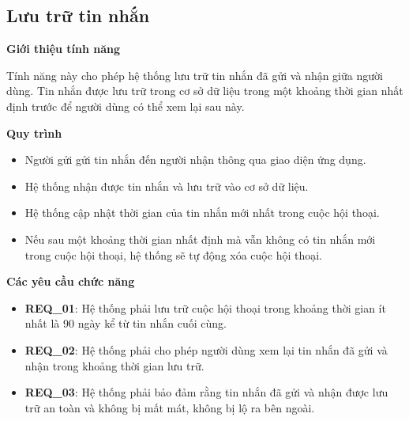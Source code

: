\subsection{Lưu trữ tin nhắn}

\noindent \textbf{Giới thiệu tính năng}

Tính năng này cho phép hệ thống lưu trữ tin nhắn đã gửi và nhận giữa người dùng. Tin nhắn được lưu trữ trong cơ sở dữ liệu trong một khoảng thời gian nhất định trước để người dùng có thể xem lại sau này.

\noindent \textbf{Quy trình}

\begin{itemize}
  \item Người gửi gửi tin nhắn đến người nhận thông qua giao diện ứng dụng.
  \item Hệ thống nhận được tin nhắn và lưu trữ vào cơ sở dữ liệu.
  \item Hệ thống cập nhật thời gian của tin nhắn mới nhất trong cuộc hội thoại.
  \item Nếu sau một khoảng thời gian nhất định mà vẫn không có tin nhắn mới trong cuộc hội thoại, hệ thống sẽ tự động xóa cuộc hội thoại.
\end{itemize}

\noindent \textbf{Các yêu cầu chức năng}

\begin{itemize}
  \item \textbf{REQ\_01}: Hệ thống phải lưu trữ cuộc hội thoại trong khoảng thời gian ít nhất là 90 ngày kể từ tin nhắn cuối cùng.
  \item \textbf{REQ\_02}: Hệ thống phải cho phép người dùng xem lại tin nhắn đã gửi và nhận trong khoảng thời gian lưu trữ.
  \item \textbf{REQ\_03}: Hệ thống phải bảo đảm rằng tin nhắn đã gửi và nhận được lưu trữ an toàn và không bị mất mát, không bị lộ ra bên ngoài.
\end{itemize}
